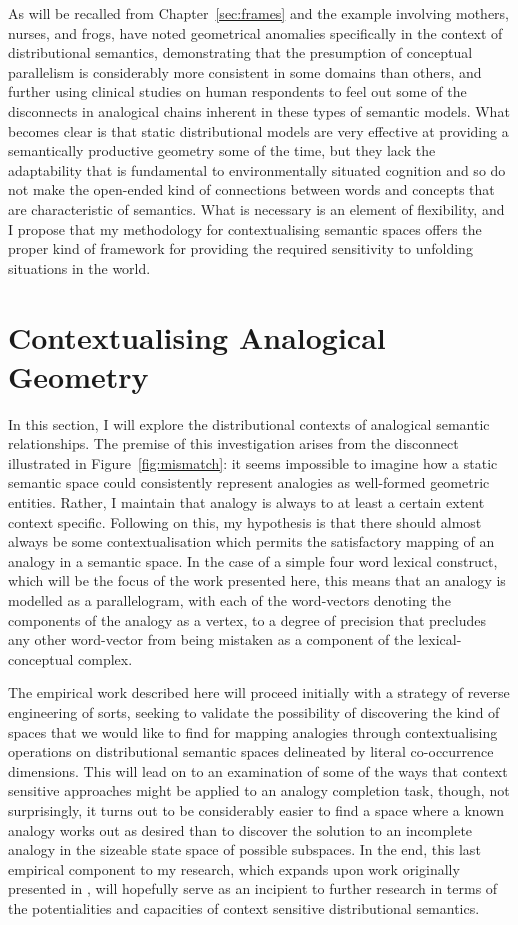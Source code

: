 As will be recalled from Chapter~\ref{sec:frames} and the example involving mothers, nurses, and frogs, \cite{ChenEA2017} have noted geometrical anomalies specifically in the context of distributional semantics, demonstrating that the presumption of conceptual parallelism is considerably more consistent in some domains than others, and further using clinical studies on human respondents to feel out some of the disconnects in analogical chains inherent in these types of semantic models.  What becomes clear is that static distributional models are very effective at providing a semantically productive geometry some of the time, but they lack the adaptability that is fundamental to environmentally situated cognition and so do not make the open-ended kind of connections between words and concepts that are characteristic of semantics.  What is necessary is an element of flexibility, and I propose that my methodology for contextualising semantic spaces offers the proper kind of framework for providing the required sensitivity to unfolding situations in the world.

\section{Contextualising Analogical Geometry} \label{sec:anatext}
In this section, I will explore the distributional contexts of analogical semantic relationships.  The premise of this investigation arises from the disconnect illustrated in Figure~\ref{fig:mismatch}: it seems impossible to imagine how a static semantic space could consistently represent analogies as well-formed geometric entities.  Rather, I maintain that analogy is always to at least a certain extent context specific.  Following on this, my hypothesis is that there should almost always be some contextualisation which permits the satisfactory mapping of an analogy in a semantic space.  In the case of a simple four word lexical construct, which will be the focus of the work presented here, this means that an analogy is modelled as a parallelogram, with each of the word-vectors denoting the components of the analogy as a vertex, to a degree of precision that precludes any other word-vector from being mistaken as a component of the lexical-conceptual complex.

The empirical work described here will proceed initially with a strategy of reverse engineering of sorts, seeking to validate the possibility of discovering the kind of spaces that we would like to find for mapping analogies through contextualising operations on distributional semantic spaces delineated by literal co-occurrence dimensions.  This will lead on to an examination of some of the ways that context sensitive approaches might be applied to an analogy completion task, though, not surprisingly, it turns out to be considerably easier to find a space where a known analogy works out as desired than to discover the solution to an incomplete analogy in the sizeable state space of possible subspaces.  In the end, this last empirical component to my research, which expands upon work originally presented in \cite{McGregorEA2016}, will hopefully serve as an incipient to further research in terms of the potentialities and capacities of context sensitive distributional semantics.

